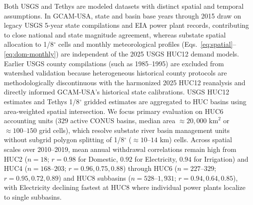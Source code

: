 \documentclass[fleqn,10pt]{wlscirep}
\begin{document}
Both USGS and Tethys are modeled datasets with distinct spatial and temporal assumptions. In GCAM-USA\cite{Binsted_2022}, state and basin base years through 2015 draw on legacy USGS 5-year state compilations and EIA power plant records, contributing to close national and state magnitude agreement, whereas substate spatial allocation to 1/8$^{\circ}$ cells and monthly meteorological profiles (Eqs.~\ref{eq:spatial}--\ref{eq:dom-monthly}) are independent of the 2025 USGS HUC12 demand models. Earlier USGS county compilations (such as 1985--1995) are excluded from watershed validation because heterogeneous historical county protocols are methodologically discontinuous with the harmonized 2025 HUC12 reanalysis\cite{Luukkonen2025JAWRA} and directly informed GCAM-USA's historical state calibrations\cite{Binsted_2022}. USGS HUC12 estimates and Tethys 1/8$^{\circ}$ gridded estimates are aggregated to HUC basins using area-weighted spatial intersection. We focus primary evaluation on HUC6 accounting units ($329$ active CONUS basins, median area $\approx 20{,}000\text{ km}^2$ or $\approx 100$--$150$ grid cells), which resolve substate river basin management units without subgrid polygon splitting of 1/8$^{\circ}$ ($\approx 10$--$14\text{ km}$) cells. Across spatial scales over 2010--2019, mean annual withdrawal correlations remain high from HUC2 ($n=18$; $r=0.98$ for Domestic, $0.92$ for Electricity, $0.94$ for Irrigation) and HUC4 ($n=168$--$203$; $r=0.96, 0.75, 0.88$) through HUC6 ($n=227$--$329$; $r=0.95, 0.72, 0.89$) and HUC8 subbasins ($n=528$--$1{,}931$; $r=0.94, 0.64, 0.85$), with Electricity declining fastest at HUC8 where individual power plants localize to single subbasins.
\end{document}
